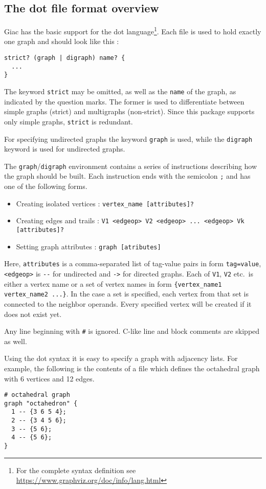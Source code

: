 \documentclass[a4paper,11pt]{article}
\begin{document}
\subsection{The {\sf dot} file format overview}\label{sec:dotformat}

Giac has the basic support for the {\sf dot} language\footnote{For the complete syntax definition see \url{https://www.graphviz.org/doc/info/lang.html}}. Each file is used to hold exactly one graph and should look like this :
\begin{verbatim}
strict? (graph | digraph) name? {
  ...
}
\end{verbatim}
The keyword {\tt strict} may be omitted, as well as the {\tt name} of the graph, as indicated by the question marks. The former is used to differentiate between simple graphs (strict) and multigraphs (non-strict). Since this package supports only simple graphs, {\tt strict} is redundant.

For specifying undirected graphs the keyword {\tt graph} is used, while the {\tt digraph} keyword is used for undirected graphs.

The {\tt graph}/{\tt digraph} environment contains a series of instructions describing how the graph should be built. Each instruction ends with the semicolon {\tt ;} and has one of the following forms.
\begin{itemize}
  \item Creating isolated vertices : {\tt vertex\_name [attributes]?}
  \item Creating edges and trails : {\tt V1 <edgeop> V2 <edgeop> ... <edgeop> Vk [attributes]?}
  \item Setting graph attributes : {\tt graph [atributes]}
\end{itemize}

Here, {\tt attributes} is a comma-separated list of tag-value pairs in form {\tt tag=value}, {\tt <edgeop>} is \verb|--| for undirected and {\tt ->} for directed graphs. Each of {\tt V1}, {\tt V2} etc.~is either a vertex name or a set of vertex names in form {\tt \{vertex\_name1 vertex\_name2 ...\}}. In the case a set is specified, each vertex from that set is connected to the neighbor operands. Every specified vertex will be created if it does not exist yet.

Any line beginning with {\tt \#} is ignored. C-like line and block comments are skipped as well.

Using the {\sf dot} syntax it is easy to specify a graph with adjacency lists. For example, the following is the contents of a file which defines the octahedral graph with 6 vertices and 12 edges.
\begin{verbatim}
# octahedral graph
graph "octahedron" {
  1 -- {3 6 5 4};
  2 -- {3 4 5 6};
  3 -- {5 6};
  4 -- {5 6};
}
\end{verbatim}
\end{document}

